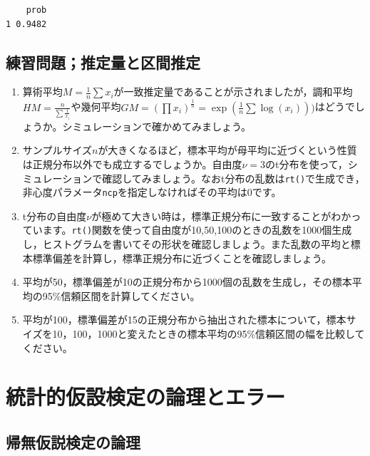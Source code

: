 \documentclass[
  a4paper,
]{ltjsbook}
\providecommand{\tightlist}{%
  \setlength{\itemsep}{0pt}\setlength{\parskip}{0pt}}\usepackage{longtable,booktabs,array}
\begin{document}
\begin{verbatim}
    prob
1 0.9482
\end{verbatim}

\section{練習問題；推定量と区間推定}\label{ux7df4ux7fd2ux554fux984cux63a8ux5b9aux91cfux3068ux533aux9593ux63a8ux5b9a}

\begin{enumerate}
\def\labelenumi{\arabic{enumi}.}
\tightlist
\item
  算術平均\(M = \frac{1}{n}\sum x_i\)が一致推定量であることが示されましたが，調和平均\(HM = \frac{n}{\sum \frac{1}{x_i}}\)や幾何平均\(GM = (\prod x_i)^{\frac{1}{n}} = \exp(\frac{1}{n}\sum \log(x_i)))\)はどうでしょうか。シミュレーションで確かめてみましょう。
\item
  サンプルサイズ\(n\)が大きくなるほど，標本平均が母平均に近づくという性質は正規分布以外でも成立するでしょうか。自由度\(\nu = 3\)のt分布を使って，シミュレーションで確認してみましょう。なおt分布の乱数は\texttt{rt()}で生成でき，非心度パラメータ\texttt{ncp}を指定しなければその平均は0です。
\item
  t分布の自由度\(\nu\)が極めて大きい時は，標準正規分布に一致することがわかっています。\texttt{rt()}関数を使って自由度が10,50,100のときの乱数を1000個生成し，ヒストグラムを書いてその形状を確認しましょう。また乱数の平均と標本標準偏差を計算し，標準正規分布に近づくことを確認しましょう。
\item
  平均が50，標準偏差が10の正規分布から1000個の乱数を生成し，その標本平均の95\%信頼区間を計算してください。
\item
  平均が100，標準偏差が15の正規分布から抽出された標本について，標本サイズを10，100，1000と変えたときの標本平均の95\%信頼区間の幅を比較してください。
\end{enumerate}


\chapter{統計的仮設検定の論理とエラー}\label{ux7d71ux8a08ux7684ux4eeeux8a2dux691cux5b9aux306eux8ad6ux7406ux3068ux30a8ux30e9ux30fc}

\section{帰無仮説検定の論理}\label{ux5e30ux7121ux4eeeux8aacux691cux5b9aux306eux8ad6ux7406}
\end{document}
